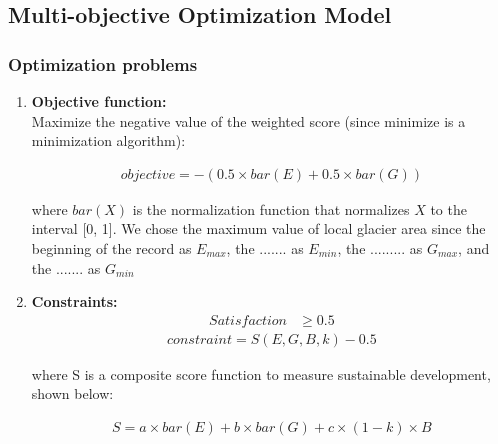 \documentclass[UTF8]{mcmthesis}
\begin{document}
        \subsection{Multi-objective Optimization Model}
        \subsubsection{Optimization problems}
        \begin{enumerate}
            \item \textbf{Objective function:} \\
            \hspace*{2em}Maximize the negative value of the weighted score (since minimize is a minimization algorithm):

            \begin{equation}
                \begin{aligned}
        objective = - (0.5\times bar(E)+0.5\times bar(G))
                \end{aligned}
                \end{equation}

                where $bar(X)$ is the normalization function that normalizes $X$ to the interval [0, 1]. We chose the maximum value of local glacier area since the beginning of the record as ${E_{max}}$, the ....... as ${E_{min}}$, the ......... as ${G_{max}}$, and the ....... as ${G_{min}}$

            \item \textbf{Constraints:} \\
            \begin{align*}
                Satisfaction & \geq 0.5 
            \end{align*}
            \begin{equation}
                \begin{aligned}
        constraint=S(E,G,B,k)-0.5
                \end{aligned}
                \end{equation}

                where S is a composite score function to measure sustainable development, shown below:

                \begin{equation}
                    \begin{aligned}
            S=a\times bar(E)+b\times bar(G)+c\times (1-k)\times B
                    \end{aligned}
                    \end{equation}


\end{enumerate}
\end{document}
